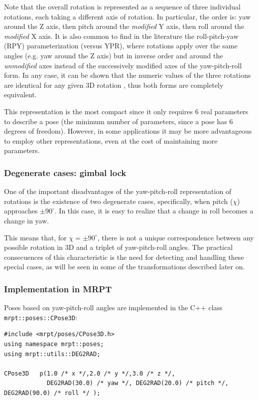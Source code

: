 \documentclass[a4paper,11pt]{report}
\begin{document}
Note that the overall rotation is represented as a sequence of three individual rotations,
each taking a different axis of rotation.
In particular, the order is: yaw around the Z axis, then pitch around the \emph{modified} Y axis,
then roll around the \emph{modified} X axis. It is also common to find in the literature
the roll-pitch-yaw (RPY) parameterization (versus YPR), where rotations apply over the same angles (e.g. yaw
around the Z axis) but in inverse order and around the \emph{unmodified} axes instead of
the successively modified axes of the yaw-pitch-roll form. In any case, it can be shown that
the numeric values of the three rotations are identical for any given 3D rotation \cite{madrigal2012slambook},
thus both forms are completely equivalent.

This representation is the most compact since it only requires 6 real parameters
to describe a pose (the minimum number of parameters, since a pose has 6 degrees of freedom).
However, in some applications it may be more advantageous to employ other representations,
even at the cost of maintaining more parameters.


\subsubsection{Degenerate cases: gimbal lock}
\label{sect:ypr:gimbal}

One of the important disadvantages of the yaw-pitch-roll representation of rotations is the existence
of two degenerate cases, specifically, when pitch ($\chi$) approaches $\pm 90^\circ$. In this case,
it is easy to realize that a change in roll becomes a change in yaw.

This means that, for $ \chi = \pm 90^\circ$, there is not a unique correspondence between any possible
rotation in 3D and a triplet of yaw-pitch-roll angles.
The practical consecuences of this characteristic is the need for detecting and handling these
special cases, as will be seen in some of the transformations described later on.


\subsubsection{Implementation in MRPT}

Poses based on yaw-pitch-roll angles are implemented in the C++ class \texttt{mrpt::poses::CPose3D}:

\begin{lstlisting}
#include <mrpt/poses/CPose3D.h>
using namespace mrpt::poses;
using mrpt::utils::DEG2RAD;

CPose3D   p(1.0 /* x */,2.0 /* y */,3.0 /* z */,
            DEG2RAD(30.0) /* yaw */, DEG2RAD(20.0) /* pitch */, DEG2RAD(90.0) /* roll */ );
\end{lstlisting}
\end{document}
